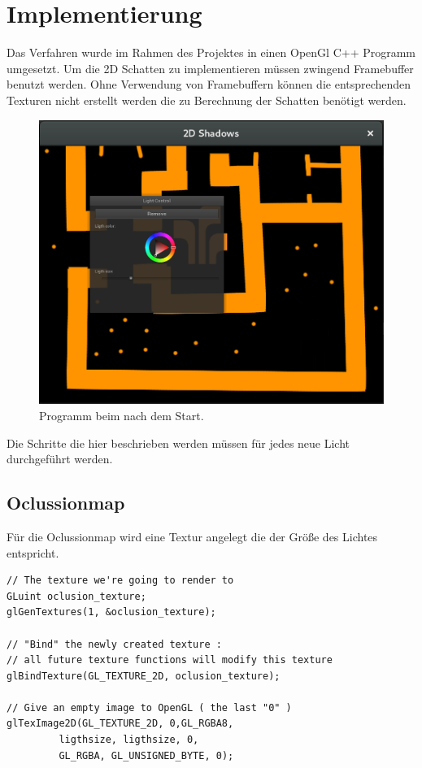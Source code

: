 \chapter{Implementierung}
Das Verfahren wurde im Rahmen des Projektes in einen OpenGl C++ Programm umgesetzt.
Um die 2D Schatten zu implementieren müssen zwingend Framebuffer benutzt werden.
Ohne Verwendung von Framebuffern können die entsprechenden Texturen nicht erstellt werden die zu Berechnung der Schatten benötigt werden. 
\begin{figure}[h]
	\centering
	\includegraphics[scale=0.25]{images/Bildschirmfoto_1.png}
	\caption{Programm beim nach dem Start.}
	\label{p_1}
\end{figure}

Die Schritte die hier beschrieben werden müssen für jedes neue Licht durchgeführt werden.
\newpage
\section{Oclussionmap}

Für die Oclussionmap wird eine Textur angelegt die der Größe des Lichtes entspricht.
\begin{lstlisting}
// The texture we're going to render to
GLuint oclusion_texture;
glGenTextures(1, &oclusion_texture);

// "Bind" the newly created texture : 
// all future texture functions will modify this texture
glBindTexture(GL_TEXTURE_2D, oclusion_texture);

// Give an empty image to OpenGL ( the last "0" )
glTexImage2D(GL_TEXTURE_2D, 0,GL_RGBA8,
		 ligthsize, ligthsize, 0,
		 GL_RGBA, GL_UNSIGNED_BYTE, 0);
\end{lstlisting}

